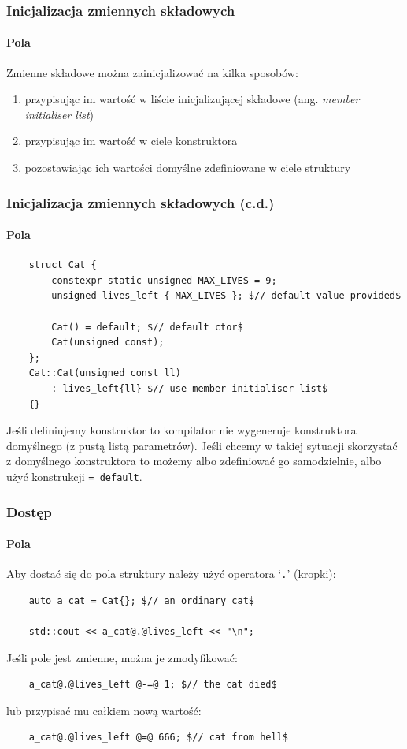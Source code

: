 \documentclass[aspectratio=169,10pt]{beamer}
\begin{document}
\begin{frame}
    \frametitle{Inicjalizacja zmiennych składowych}
    \framesubtitle{Pola}

    Zmienne składowe można zainicjalizować na kilka sposobów:
    \begin{enumerate}
        \item przypisując im wartość w liście inicjalizującej składowe (ang.
            \emph{member initialiser list})
        \item przypisując im wartość w ciele konstruktora
        \item pozostawiając ich wartości domyślne zdefiniowane w ciele struktury
    \end{enumerate}
\end{frame}

\begin{frame}[fragile]
    \frametitle{Inicjalizacja zmiennych składowych (c.d.)}
    \framesubtitle{Pola}

    {\scriptsize
    \begin{lstlisting}
    struct Cat {
        constexpr static unsigned MAX_LIVES = 9;
        unsigned lives_left { MAX_LIVES }; $// default value provided$

        Cat() = default; $// default ctor$
        Cat(unsigned const);
    };
    Cat::Cat(unsigned const ll)
        : lives_left{ll} $// use member initialiser list$
    {}
    \end{lstlisting}}

    Jeśli definiujemy konstruktor to kompilator nie wygeneruje konstruktora
    domyślnego (z pustą listą parametrów). Jeśli chcemy w takiej sytuacji
    skorzystać z domyślnego konstruktora to możemy albo zdefiniować go
    samodzielnie, albo użyć konstrukcji {\tt = default}.
\end{frame}

\begin{frame}[fragile]
    \frametitle{Dostęp}
    \framesubtitle{Pola}

    Aby dostać się do pola struktury należy użyć operatora `{\tt .}' (kropki):

    {\small
    \begin{lstlisting}
    auto a_cat = Cat{}; $// an ordinary cat$

    std::cout << a_cat@.@lives_left << "\n";
    \end{lstlisting}}

    Jeśli pole jest zmienne, można je zmodyfikować:

    {\small
    \begin{lstlisting}
    a_cat@.@lives_left @-=@ 1; $// the cat died$
    \end{lstlisting}}

    lub przypisać mu całkiem nową wartość:

    {\small
    \begin{lstlisting}
    a_cat@.@lives_left @=@ 666; $// cat from hell$
    \end{lstlisting}}
\end{frame}
\end{document}
